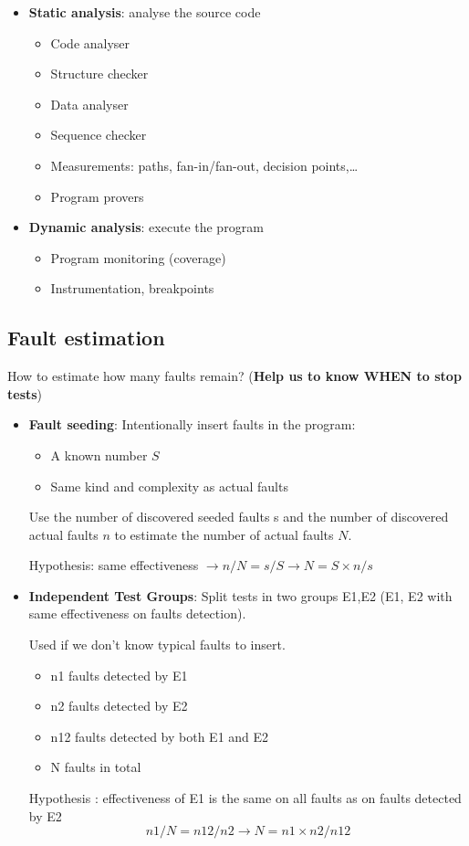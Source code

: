 \begin{itemize}
\item \textbf{Static analysis}: analyse the source code
\begin{itemize}
    \item Code analyser
    \item Structure checker
    \item Data analyser
    \item Sequence checker
    \item Measurements: paths, fan-in/fan-out, decision points,\ldots
    \item Program provers
\end{itemize}

\item \textbf{Dynamic analysis}: execute the program
\begin{itemize}
    \item Program monitoring (coverage)
    \item Instrumentation, breakpoints
\end{itemize}
\end{itemize}

\subsection{Fault estimation}

How to estimate how many faults remain? (\textbf{Help us to know WHEN to stop tests}) 

\begin{itemize}
        \item \textbf{Fault seeding}: Intentionally insert faults in the program:
\begin{itemize}
    \item A known number $S$
    \item Same kind and complexity as actual faults
\end{itemize}

Use the number of discovered seeded faults s and the number of discovered actual faults $n$ to estimate the number of actual faults $N$.

Hypothesis: same effectiveness $\rightarrow n / N = s / S \rightarrow N = S \times n / s$


\item \textbf{Independent Test Groups}: Split tests in two groups E1,E2
    (E1, E2 with same effectiveness on faults detection).

    Used if we don't know typical faults to insert.

\begin{itemize}
	\item n1 faults detected by E1
	\item n2 faults detected by E2
	\item n12 faults detected by both E1 and E2
	\item N faults in total
\end{itemize} 

Hypothesis : effectiveness of E1 is the same on all faults as on faults
detected by E2
$$ n1/N=n12/n2 \rightarrow N = n1\times n2/n12$$
\end{itemize}


